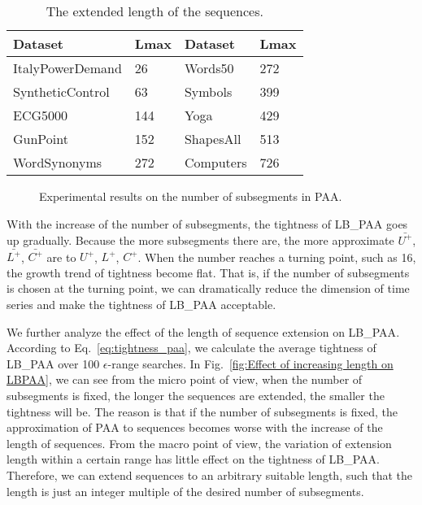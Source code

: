 \documentclass[10pt,journal,compsoc]{IEEEtran}
\begin{document}
\begin{table}[H]
\centering
\caption{The extended length of the sequences.}\label{tab:extended length}
\begin{tabular}{p{2.1cm}p{1cm}<{\centering}|p{1.2cm}p{1cm}<{\centering}}
\hline
\textbf{Dataset} & \textbf{Lmax} & \textbf{Dataset}  &	\textbf{Lmax} \\
\hline
ItalyPowerDemand   &26 &Words50   &272 \\
SyntheticControl   &63 &Symbols   &399 \\
ECG5000   &144 &Yoga   &429 \\
GunPoint   &152 &ShapesAll   &513 \\
WordSynonyms   &272 &Computers  &726 \\
\hline
\end{tabular}
\end{table}

\begin{figure}[!htbp]
\centering
{}
\caption{Experimental results on the number of subsegments in PAA.}
\label{fig:subsegments in PAA}
\end{figure}

With the increase of the number of subsegments,
the tightness of LB\_{PAA} goes up gradually.
Because the more subsegments there are,
the more approximate $\bar{U^+}$, $\bar{L^+}$, $\bar{C^+}$ are to $U^+$, $L^+$, $C^+$.
When the number reaches a turning point, such as 16,
the growth trend of tightness become flat.
That is, if the number of subsegments is chosen at the turning point,
we can dramatically reduce the dimension of time series
and make the tightness of LB\_{PAA} acceptable.

We further analyze the effect of the length of sequence extension on LB\_{PAA}.
According to Eq.~\eqref{eq:tightness_paa},
we calculate the average tightness of LB\_{PAA} over 100 $\epsilon$-range searches.
In Fig.~\ref{fig:Effect of increasing length on LBPAA},
we can see from the micro point of view,
when the number of subsegments is fixed,
the longer the sequences are extended, the smaller the tightness will be.
The reason is that if the number of subsegments is fixed,
the approximation of PAA to sequences becomes worse with the increase of the length of sequences.
From the macro point of view,
the variation of extension length within a certain range has little effect on the tightness of LB\_{PAA}.
Therefore, we can extend sequences to an arbitrary suitable length,
such that the length is just an integer multiple of the desired number of subsegments.
\end{document}
